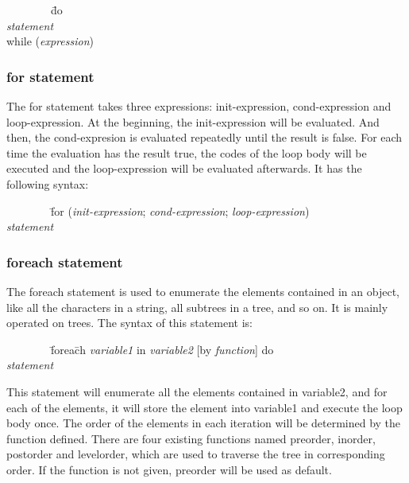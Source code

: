 \documentclass[12pt,psfig,a4]{article}
\begin{document}
\begin{code}
\begin{tabbing}
~~~~~~~~\= do \= \\
\> \> \textsl{statement} \\
\> while (\textsl{expression})
\end{tabbing}
\end{code}

\subsubsection{for statement}
The for statement takes three expressions: init-expression, cond-expression and loop-expression. At the beginning, the init-expression will be evaluated. And then, the cond-expresion is evaluated repeatedly until the result is false. For each time the evaluation has the result true, the codes of the loop body will be executed and the loop-expression will be evaluated afterwards. It has the following syntax:

\begin{code}
\begin{tabbing}
~~~~~~~~\= for (\= \textsl{init-expression}; \textsl{cond-expression}; \textsl{loop-expression}) \\
\> \> \textsl{statement}
\end{tabbing}
\end{code}

\subsubsection{foreach statement}
The foreach statement is used to enumerate the elements contained in an object, like all the characters in a string, all subtrees in a tree, and so on. It is mainly operated on trees. The syntax of this statement is:

\begin{code}
\begin{tabbing}
~~~~~~~~\= forea\= ch \textsl{variable1} in \textsl{variable2} [by \textsl{function}] do \\
\> \> \textsl{statement}
\end{tabbing}
\end{code}

This statement will enumerate all the elements contained in variable2, and for each of the elements, it will store the element into variable1 and execute the loop body once. The order of the elements in each iteration will be determined by the function defined. There are four existing functions named preorder, inorder, postorder and levelorder, which are used to traverse the tree in corresponding order. If the function is not given, preorder will be used as default.
\end{document}
